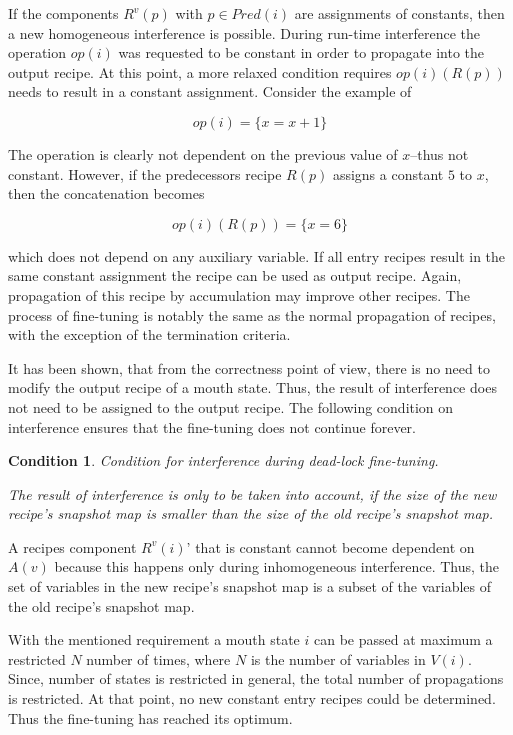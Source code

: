 \documentclass[12pt,a4paper]{scrartcl}
\newtheorem{condition}{Condition}
\begin{document}
If the components $R^v(p)$ with $p \in Pred(i)$ are assignments of
constants, then a new homogeneous interference is possible. During run-time
interference the operation $op(i)$ was requested to be constant in order to
propagate into the output recipe. At this point, a more relaxed condition
requires $op(i)(R(p))$ needs to result in a constant assignment. Consider the
example of 

\begin{equation}
                       op(i) = \{ x = x + 1 \}
\end{equation}

The operation is clearly not dependent on the previous value of $x$--thus not
constant. However, if the predecessors recipe $R(p)$ assigns a constant $5$ to
$x$, then the concatenation becomes

\begin{equation}
                       op(i)(R(p)) = \{ x = 6 \}
\end{equation}

which does not depend on any auxiliary variable. If all entry recipes result in
the same constant assignment the recipe can be used as output recipe. Again,
propagation of this recipe by accumulation may improve other recipes. The process
of fine-tuning is notably the same as the normal propagation of recipes, with 
the exception of the termination criteria.

It has been shown, that from the correctness point of view, there is no need to
modify the output recipe of a mouth state. Thus, the result of interference
does not need to be assigned to the output recipe. The following condition 
on interference ensures that the fine-tuning does not continue forever.

\begin{condition}
Condition for interference during dead-lock fine-tuning.

The result of interference is only to be taken into account, if the size of the
new recipe's snapshot map is smaller than the size of the old recipe's snapshot
map.  
\end{condition}

A recipes component $R^v(i)$' that is constant cannot become dependent on
$A(v)$ because this happens only during inhomogeneous interference. Thus, the
set of variables in the new recipe's snapshot map is a subset of the variables
of the old recipe's snapshot map.

With the mentioned requirement a mouth state $i$ can be passed at maximum a
restricted $N$ number of times, where $N$ is the number of variables in
$V(i)$. Since, number of states is restricted in general, the total number of
propagations is restricted. At that point, no new constant entry recipes could
be determined. Thus the fine-tuning has reached its optimum.
\end{document}
